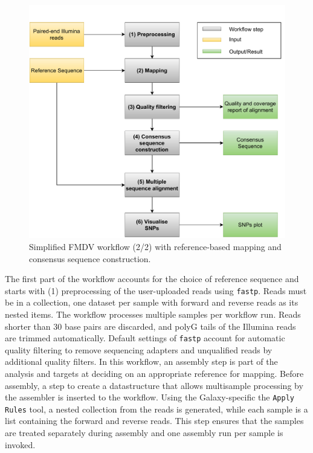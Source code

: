\begin{figure}[ht!]
	\centering
	\includegraphics[width=1\textwidth]{media/3-fmdv-2-2.pdf}
	\caption{Simplified \ac{FMDV} workflow (2/2) with reference-based mapping and consensus sequence construction.}
	\label{fig:3-fmdv-wf-2}
\end{figure}
The first part of the workflow accounts for the choice of reference sequence and starts with (1) preprocessing of the user-uploaded reads using \texttt{fastp}. Reads must be in a collection, one dataset per sample with forward and reverse reads as its nested items. The workflow processes multiple samples per workflow run. Reads shorter than 30 base pairs are discarded, and polyG tails of the Illumina reads are trimmed automatically. Default settings of \texttt{fastp} account for automatic quality filtering to remove sequencing adapters and unqualified reads by additional quality filters. In this workflow, an assembly step is part of the analysis and targets at deciding on an appropriate reference for mapping. Before assembly, a step to create a datastructure that allows multisample processing by the assembler is inserted to the workflow. Using the Galaxy-specific the \texttt{Apply Rules} tool, a nested collection from the reads is generated, while each sample is a list containing the forward and reverse reads. This step ensures that the samples are treated separately during assembly and one assembly run per sample is invoked.\\
